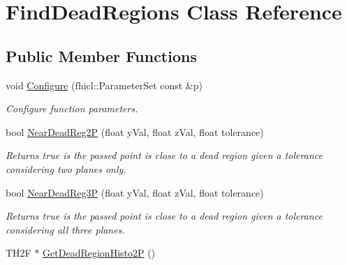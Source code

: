 \hypertarget{classFindDeadRegions}{\section{\-Find\-Dead\-Regions \-Class \-Reference}
\label{classFindDeadRegions}
}
\subsection*{\-Public \-Member \-Functions}
\begin{DoxyCompactItemize}
\item 
\hypertarget{classFindDeadRegions_a94b207b673c58df861537ead4ec5385a}{void \hyperlink{classFindDeadRegions_a94b207b673c58df861537ead4ec5385a}{\-Configure} (fhicl\-::\-Parameter\-Set const \&p)}\label{classFindDeadRegions_a94b207b673c58df861537ead4ec5385a}

\begin{DoxyCompactList}\small\item\em \-Configure function parameters. \end{DoxyCompactList}\item 
\hypertarget{classFindDeadRegions_a7a884dc4685e66734b98afea9a2c6c21}{bool \hyperlink{classFindDeadRegions_a7a884dc4685e66734b98afea9a2c6c21}{\-Near\-Dead\-Reg2\-P} (float y\-Val, float z\-Val, float tolerance)}\label{classFindDeadRegions_a7a884dc4685e66734b98afea9a2c6c21}

\begin{DoxyCompactList}\small\item\em \-Returns true is the passed point is close to a dead region given a tolerance considering two planes only. \end{DoxyCompactList}\item 
\hypertarget{classFindDeadRegions_a2ef76eca81785361bf95c17e8e1a7574}{bool \hyperlink{classFindDeadRegions_a2ef76eca81785361bf95c17e8e1a7574}{\-Near\-Dead\-Reg3\-P} (float y\-Val, float z\-Val, float tolerance)}\label{classFindDeadRegions_a2ef76eca81785361bf95c17e8e1a7574}

\begin{DoxyCompactList}\small\item\em \-Returns true is the passed point is close to a dead region given a tolerance considering all three planes. \end{DoxyCompactList}\item 
\hypertarget{classFindDeadRegions_a712767abce6132b0dd6638a335da87fa}{\-T\-H2\-F $\ast$ \hyperlink{classFindDeadRegions_a712767abce6132b0dd6638a335da87fa}{\-Get\-Dead\-Region\-Histo2\-P} ()}\label{classFindDeadRegions_a712767abce6132b0dd6638a335da87fa}


\end{DoxyCompactItemize}
